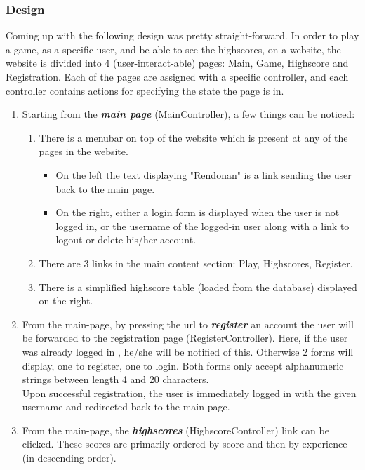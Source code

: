 \documentclass[12pt]{report}
\begin{document}
\subsubsection{Design}
Coming up with the following design was pretty straight-forward. In order to play a game, as a specific user, and be able to see the highscores, on a website, the website is divided into 4 (user-interact-able) pages: Main, Game, Highscore and Registration. Each of the pages are assigned with a specific controller, and each controller contains actions for specifying the state the page is in.
\begin{enumerate}
\item Starting from the \emph{\textbf{main page}} (MainController), a few things can be noticed:
\begin{enumerate}
\item There is a menubar on top of the website which is present at any of the pages in the website.
\begin{itemize}
\item On the left the text displaying "Rendonan" is a link sending the user back to the main page.
\item On the right, either a login form is displayed when the user is not logged in, or the username of the logged-in user along with a link to logout or delete his/her account.
\end{itemize}
\item There are 3 links in the main content section: Play, Highscores, Register.
\item There is a simplified highscore table (loaded from the database) displayed on the right.
\end{enumerate}
\item From the main-page, by pressing the url to \emph{\textbf{register}} an account the user will be forwarded to the registration page (RegisterController). Here, if the user was already logged in , he/she will be notified of this. Otherwise 2 forms will display, one to register, one to login. Both forms only accept alphanumeric strings between length 4 and 20 characters.\\
Upon successful registration, the user is immediately logged in with the given username and redirected back to the main page.
\item From the main-page, the \emph{\textbf{highscores}} (HighscoreController) link can be clicked. These scores are primarily ordered by score and then by experience (in descending order).\\

\end{enumerate}
\end{document}

